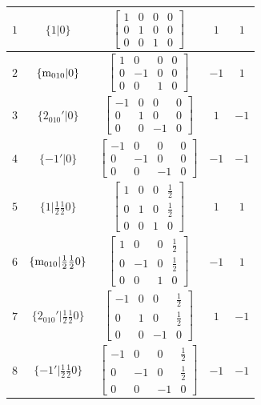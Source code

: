 \documentclass[fleqn,8pt]{jsarticle}
\begin{document}
\begin{longtable}{ccccc}
$ 1 $ & $ \{1|0\} $ & $ \begin{bmatrix} 1 & 0 & 0 & 0 \\ 0 & 1 & 0 & 0 \\ 0 & 0 & 1 & 0 \end{bmatrix} $ & $ 1 $ & $ 1 $ \\ \hline
$ 2 $ & $ \{{\rm m}_{010}|0\} $ & $ \begin{bmatrix} 1 & 0 & 0 & 0 \\ 0 & -1 & 0 & 0 \\ 0 & 0 & 1 & 0 \end{bmatrix} $ & $ -1 $ & $ 1 $ \\ \hline
$ 3 $ & $ \{2{}_{010}{}'|0\} $ & $ \begin{bmatrix} -1 & 0 & 0 & 0 \\ 0 & 1 & 0 & 0 \\ 0 & 0 & -1 & 0 \end{bmatrix} $ & $ 1 $ & $ -1 $ \\ \hline
$ 4 $ & $ \{-1{}'|0\} $ & $ \begin{bmatrix} -1 & 0 & 0 & 0 \\ 0 & -1 & 0 & 0 \\ 0 & 0 & -1 & 0 \end{bmatrix} $ & $ -1 $ & $ -1 $ \\ \hline
$ 5 $ & $ \{1|\frac{1}{2} \frac{1}{2} 0\} $ & $ \begin{bmatrix} 1 & 0 & 0 & \frac{1}{2} \\ 0 & 1 & 0 & \frac{1}{2} \\ 0 & 0 & 1 & 0 \end{bmatrix} $ & $ 1 $ & $ 1 $ \\ \hline
$ 6 $ & $ \{{\rm m}_{010}|\frac{1}{2} \frac{1}{2} 0\} $ & $ \begin{bmatrix} 1 & 0 & 0 & \frac{1}{2} \\ 0 & -1 & 0 & \frac{1}{2} \\ 0 & 0 & 1 & 0 \end{bmatrix} $ & $ -1 $ & $ 1 $ \\ \hline
$ 7 $ & $ \{2{}_{010}{}'|\frac{1}{2} \frac{1}{2} 0\} $ & $ \begin{bmatrix} -1 & 0 & 0 & \frac{1}{2} \\ 0 & 1 & 0 & \frac{1}{2} \\ 0 & 0 & -1 & 0 \end{bmatrix} $ & $ 1 $ & $ -1 $ \\ \hline
$ 8 $ & $ \{-1{}'|\frac{1}{2} \frac{1}{2} 0\} $ & $ \begin{bmatrix} -1 & 0 & 0 & \frac{1}{2} \\ 0 & -1 & 0 & \frac{1}{2} \\ 0 & 0 & -1 & 0 \end{bmatrix} $ & $ -1 $ & $ -1 $ \\
\end{longtable}
\end{document}
